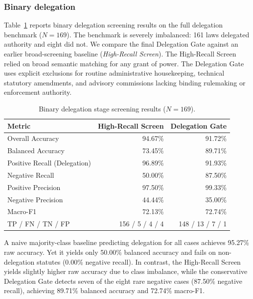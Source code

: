 \documentclass[runningheads]{llncs}
\begin{document}
\subsubsection{Binary delegation}

Table~\ref{tab:binary} reports binary delegation screening results on the full delegation benchmark ($N=169$). The benchmark is severely imbalanced: 161 laws delegated authority and eight did not. We compare the final Delegation Gate against an earlier broad-screening baseline (\emph{High-Recall Screen}). The High-Recall Screen relied on broad semantic matching for any grant of power. The Delegation Gate uses explicit exclusions for routine administrative housekeeping, technical statutory amendments, and advisory commissions lacking binding rulemaking or enforcement authority.


\begin{table}[htbp]
\centering
\caption{Binary delegation stage screening results ($N=169$).}
\label{tab:binary}
\small
\begin{tabular}{@{}l@{\hspace{3pt}}rr@{}}
\toprule
\textbf{Metric} & \textbf{High-Recall Screen} & \textbf{Delegation Gate} \\
\midrule
Overall Accuracy & 94.67\% & 91.72\% \\
Balanced Accuracy & 73.45\% & 89.71\% \\
Positive Recall (Delegation) & 96.89\% & 91.93\% \\
Negative Recall & 50.00\% & 87.50\% \\
Positive Precision & 97.50\% & 99.33\% \\
Negative Precision & 44.44\% & 35.00\% \\
Macro-F1 & 72.13\% & 72.74\% \\
\midrule
TP / FN / TN / FP & 156 / 5 / 4 / 4 & 148 / 13 / 7 / 1 \\
\bottomrule
\end{tabular}
\end{table}

A naive majority-class baseline predicting delegation for all cases achieves 95.27\% raw accuracy. Yet it yields only 50.00\% balanced accuracy and fails on non-delegation statutes (0.00\% negative recall). In contrast, the High-Recall Screen yields slightly higher raw accuracy due to class imbalance, while the conservative Delegation Gate detects seven of the eight rare negative cases (87.50\% negative recall), achieving 89.71\% balanced accuracy and 72.74\% macro-F1.
\vspace{-0.4cm}
\end{document}
